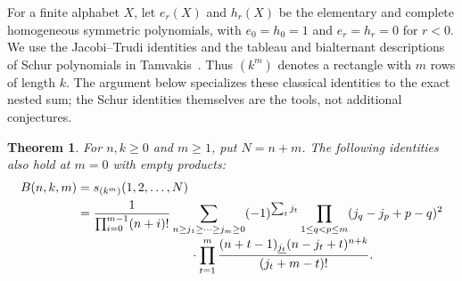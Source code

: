\documentclass[11pt]{article}
\newtheorem{theorem}{Theorem}
\newcommand{\Schur}{s}
\begin{document}
For a finite alphabet $X$, let $e_r(X)$ and $h_r(X)$ be the elementary and complete
homogeneous symmetric polynomials, with $e_0=h_0=1$ and $e_r=h_r=0$ for $r<0$.
We use the Jacobi--Trudi identities and the tableau and bialternant descriptions
of Schur polynomials in Tamvakis~\cite[\S\S2.7, 3.2--3.5]{tamvakis}.
Thus $(k^m)$ denotes a rectangle with $m$ rows of length $k$.
The argument below specializes these classical identities to the exact nested
sum; the Schur identities themselves are the tools, not additional conjectures.

\begin{theorem}\label{thm:main}
For $n,k\geq0$ and $m\geq1$, put $N=n+m$.
The following identities also hold at $m=0$ with empty products:
\begin{align}
B(n,k,m)&=\Schur_{(k^m)}(1,2,\ldots,N)\label{eq:schur}\\
&=\frac{1}{\prod_{i=0}^{m-1}(n+i)!}
\sum_{n\geq j_1\geq\cdots\geq j_m\geq0}
(-1)^{\sum_tj_t}
\prod_{1\leq q<p\leq m}(j_q-j_p+p-q)^2\notag\\[-2pt]
&\hspace{32mm}\cdot
\prod_{t=1}^{m}
\frac{(n+t-1)_{\underline{j_t}}(n-j_t+t)^{n+k}}
{(j_t+m-t)!}.\label{eq:sum}
\end{align}
\end{theorem}
\end{document}
